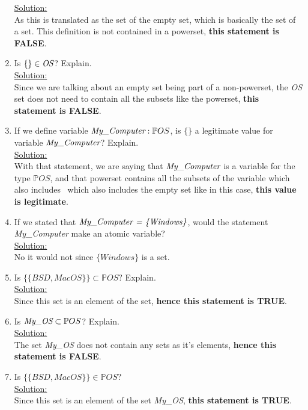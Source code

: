 \begin{enumerate}
  \noindent\underline{Solution:}\\ As this is translated as the set of the empty set, which is basically the set of a set. This definition is not contained in a powerset, \textbf{this statement is FALSE}.
  \item Is $\{ \} \in \emph{OS}$? Explain.\\
  \noindent\underline{Solution:}\\ Since we are talking about an empty set being part of a non-powerset, the \emph{OS} set does not need to contain all the subsets like the powerset, \textbf{this statement is FALSE}.
  \item If we define variable $\emph{My\_Computer} : \mathbb{P}OS$, is $\{ \}$ a legitimate value for variable  $\emph{My\_Computer}$? Explain.\\
  \noindent\underline{Solution:}\\ With that statement, we are saying that $\emph{My\_Computer}$ is a variable for the type $\mathbb{P}OS$, and that powerset contains all the subsets of the variable which also includes \
  which also includes the empty set like in this case, \textbf{this value is legitimate}.
  \item If we stated that $\emph{{My\_Computer} = \{Windows\}}$, would the statement \emph{My\_Computer} make an atomic variable?\\
  \noindent\underline{Solution:}\\ No it would not since  $\{Windows\}$ is a set.
  \item Is $\{\{BSD, MacOS\}\} \subset \mathbb{P}OS$? Explain.\\
  \noindent\underline{Solution:}\\ Since this set is an element of the set, \textbf{hence this statement is TRUE}.
  \item Is $\emph{My\_OS} \subset \mathbb{P}OS$? Explain.\\
  \noindent\underline{Solution:}\\ The set \emph{My\_OS} does not contain any sets as it's elements, \textbf{hence this statement is FALSE}.
  \item Is $\{{\{BSD, MacOS\}\}} \in \mathbb{P}OS$?\\
  \noindent\underline{Solution:}\\ Since this set is an element of the set \emph{My\_OS}, \textbf{this statement is TRUE}.

  

\end{enumerate}

